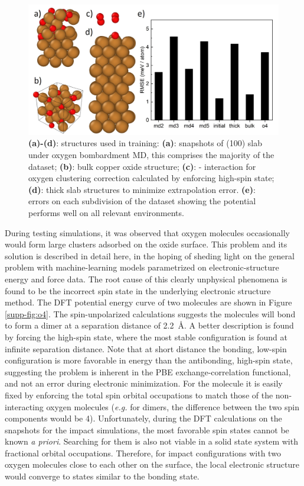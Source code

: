 \documentclass[manuscript=cmatex]{achemso}
\begin{document}
\begin{figure}[h]
  \centering
  \includegraphics[width=\textwidth]{structures}
  \caption[Representative structures used in training and energy error on the subsets]{\textbf{(a)-(d)}: structures used in training: \textbf{(a)}: snapshots of  (100) slab under oxygen bombardment MD, this comprises the majority of the dataset; \textbf{(b)}: bulk copper oxide structure; \textbf{(c)}: - interaction for oxygen clustering correction calculated by enforcing high-spin state; \textbf{(d)}: thick slab structures to minimize extrapolation error. \textbf{(e)}: errors on each subdivision of the dataset showing the potential performs well on all relevant environments.}
  \label{fig:subset}
\end{figure}

During testing simulations, it was observed that oxygen molecules occasionally would form large clusters adsorbed on the oxide surface. This problem and its solution is described in detail here, in the hoping of sheding light on the general problem with machine-learning models parametrized on electronic-structure energy and force data. The root cause of this clearly unphysical phenomena is found to be the incorrect spin state in the underlying electronic structure method. The DFT potential energy curve of two  molecules are shown in Figure \ref{supp-fig:o4}. The spin-unpolarized calculations suggests the molecules will bond to form a  dimer at a separation distance of \SI{2.2}{\AA}. A better description is found by forcing the high-spin state, where the most stable configuration is found at infinite separation distance. Note that at short distance the bonding, low-spin configuration is more favorable in energy than the antibonding, high-spin state, suggesting the problem is inherent in the PBE exchange-correlation functional, and not an error during electronic minimization. For the molecule it is easily fixed by enforcing the total spin orbital occupations to match those of the non-interacting oxygen molecules (\textit{e.g.} for dimers, the difference between the two spin components would be 4). Unfortunately, during the DFT calculations on the snapshots for the impact simulations, the most favorable spin states cannot be known \textit{a priori}. Searching for them is also not viable in a solid state system with fractional orbital occupations. Therefore, for impact configurations with two oxygen molecules close to each other on the surface, the local electronic structure would converge to states similar to the bonding state. 
\end{document}
